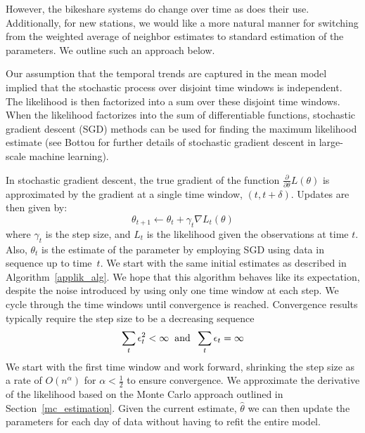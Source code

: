 \documentclass{acm_proc_article-sp}
\begin{document}
However, the bikeshare systems do change over time as does their use.  Additionally, for new stations, we would like a more natural manner for switching from the weighted average of neighbor estimates to standard estimation of the parameters.  We outline such an approach below.

Our assumption that the temporal trends are captured in the mean model implied that the stochastic process over disjoint time windows is independent.  The likelihood is then factorized into a sum over these disjoint time windows.  When the likelihood factorizes into the sum of differentiable functions, stochastic gradient descent (SGD) methods can be used for finding the maximum likelihood estimate (see Bottou \cite{bottou:sgd} for further details of stochastic gradient descent in large-scale machine learning).

In stochastic gradient descent, the true gradient of the function $\frac{\partial}{\partial \theta} L( \theta)$ is approximated by the gradient at a single time window, $(t, t+\delta)$.  Updates are then given by:
\begin{equation}
\theta_{t+1} \gets \theta_{t} + \gamma_t \nabla L_t (\theta) 
\end{equation}
\noindent where $\gamma_t$ is the step size, and $L_t$ is the likelihood given the observations at time $t$.  Also, $\theta_t$ is the estimate of the parameter by employing SGD using data in sequence up to time~$t$.  We start with the same initial estimates as described in Algorithm~\ref{applik_alg}.  We hope that this algorithm behaves like its expectation, despite the noise introduced by using only one time window at each step.  We cycle through the time windows until convergence is reached. Convergence results typically require the step size to be a decreasing sequence 
\begin{equation} \label{sgd_conditions}
\sum_{t} \epsilon_t^2 < \infty \hspace{0.2 cm} \text{and} \hspace{0.2cm} \sum_{t} \epsilon_t = \infty
\end{equation}
\noindent We start with the first time window and work forward, shrinking the step size as a rate of $O(n^{\alpha})$ for $\alpha < \frac{1}{2}$ to ensure convergence.  We approximate the derivative of the likelihood based on the Monte Carlo approach outlined in Section~\ref{mc_estimation}.  Given the current estimate, $\hat{\theta}$ we can then update the parameters for each day of data without having to refit the entire model.
\end{document}

